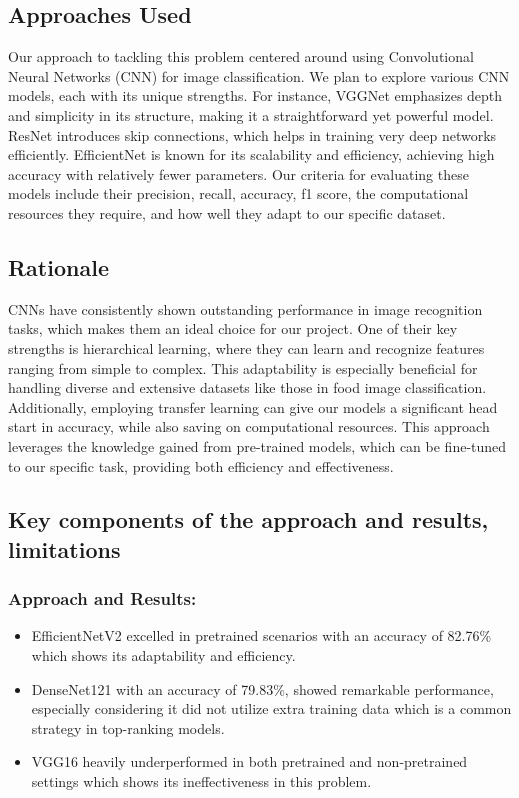 \documentclass{article}
\begin{document}
\subsection{Approaches Used}
Our approach to tackling this problem centered around using Convolutional Neural Networks (CNN) for image classification. We plan to explore various CNN models, each with its unique strengths. For instance, VGGNet emphasizes depth and simplicity in its structure, making it a straightforward yet powerful model. ResNet introduces skip connections, which helps in training very deep networks efficiently. EfficientNet is known for its scalability and efficiency, achieving high accuracy with relatively fewer parameters. Our criteria for evaluating these models include their precision, recall, accuracy, f1 score, the computational resources they require, and how well they adapt to our specific dataset.

\subsection{Rationale}
CNNs have consistently shown outstanding performance in image recognition tasks, which makes them an ideal choice for our project. One of their key strengths is hierarchical learning, where they can learn and recognize features ranging from simple to complex. This adaptability is especially beneficial for handling diverse and extensive datasets like those in food image classification. Additionally, employing transfer learning can give our models a significant head start in accuracy, while also saving on computational resources. This approach leverages the knowledge gained from pre-trained models, which can be fine-tuned to our specific task, providing both efficiency and effectiveness.


\subsection{Key components of the approach and results, limitations}

 \subsubsection{Approach and Results:}
\begin{itemize}
    \item EfficientNetV2 excelled in pretrained scenarios with an accuracy of 82.76\% which shows its adaptability and efficiency.
    \item DenseNet121 with an accuracy of 79.83\%, showed remarkable performance, especially considering it did not utilize extra training data which is a common strategy in top-ranking models.
    \item VGG16 heavily underperformed in both pretrained and non-pretrained settings which shows its ineffectiveness in this problem.
\end{itemize}
\end{document}
